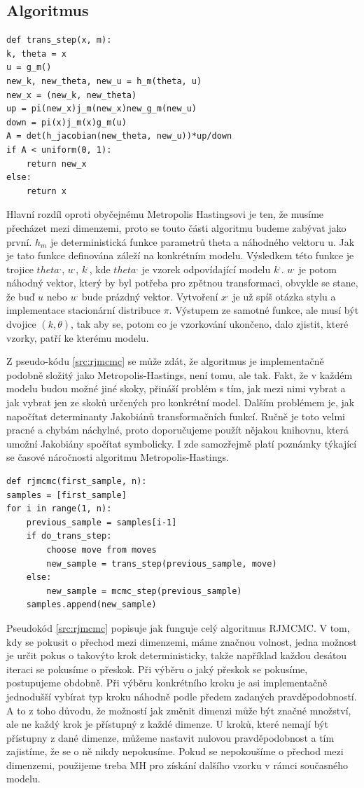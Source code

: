 \documentclass[czech,master,public,dept470,male,cpdeclaration,oneside, python]{diploma}
\begin{document}
\subsection{Algoritmus}
\begin{lstlisting}[label=src:trans_step,caption=Algoritmus pro mezi dimenzionální skok]
def trans_step(x, m):
k, theta = x
u = g_m()
new_k, new_theta, new_u = h_m(theta, u)
new_x = (new_k, new_theta)
up = pi(new_x)j_m(new_x)new_g_m(new_u)
down = pi(x)j_m(x)g_m(u)
A = det(h_jacobian(new_theta, new_u))*up/down
if A < uniform(0, 1):
    return new_x
else:
	return x
\end{lstlisting}
Hlavní rozdíl oproti obyčejnému Metropolis Hastingsovi je ten, že musíme přecházet mezi dimenzemi, proto se touto části algoritmu budeme zabývat jako první. $h_m$ je  deterministická funkce parametrů theta a náhodného vektoru u. Jak je tato funkce definována záleží na konkrétním modelu. Výsledkem této funkce je trojice $theta^{,}$, $u^{,}$, $k^{,}$, kde $theta^{,}$ je vzorek odpovídající modelu $k^{,}$. $u^{,}$ je potom náhodný vektor, který by byl potřeba pro zpětnou transformaci, obvykle se stane, že buď $u$ nebo $u^{,}$ bude prázdný vektor. Vytvoření $x^{,}$ je už spíš otázka stylu a implementace stacionární distribuce $\pi$. Výstupem ze samotné funkce, ale musí být dvojice $(k, \theta)$, tak aby se, potom co je vzorkování ukončeno, dalo zjistit, které vzorky, patří ke kterému modelu. \par
Z pseudo-kódu \ref{src:rjmcmc} se může zdát, že algoritmus je implementačně podobně složitý jako Metropolis-Hastings, není tomu, ale tak. Fakt, že v každém modelu budou možné jiné skoky, přináší problém s tím, jak mezi nimi vybrat a jak vybrat jen ze skoků určených pro konkrétní model. Dalším problémem je, jak napočítat determinanty Jakobiánů transformačních funkcí. Ručně je toto velmi pracné a chybám náchylné, proto doporučujeme použít nějakou knihovnu, která umožní Jakobiány spočítat symbolicky. I zde samozřejmě platí poznámky týkající se časové náročnosti algoritmu Metropolis-Hastings.
\begin{lstlisting}[label=src:rjmcmc,caption=Celkový RJMCMC algoritmus]
def rjmcmc(first_sample, n):
samples = [first_sample]
for i in range(1, n):
	previous_sample = samples[i-1]
	if do_trans_step:
		choose move from moves
		new_sample = trans_step(previous_sample, move)
	else:
		new_sample = mcmc_step(previous_sample)
	samples.append(new_sample)
\end{lstlisting}
Pseudokód \ref{src:rjmcmc} popisuje jak funguje celý algoritmus RJMCMC. V tom, kdy se pokusit o přechod mezi dimenzemi, máme značnou volnost, jedna možnost je určit pokus o takovýto krok deterministicky, takže například každou desátou iteraci se pokusíme o přeskok. Při výběru o jaký přeskok se pokusíme, postupujeme obdobně. Při výběru konkrétního kroku je asi implementačně jednodušší vybírat typ kroku náhodně podle předem zadaných pravděpodobností. A to z toho důvodu, že možností jak změnit dimenzi může být značné množství, ale ne každý krok je přístupný z každé dimenze. U kroků, které nemají být přístupny z dané dimenze, můžeme nastavit nulovou pravděpodobnost a tím zajistíme, že se o ně nikdy nepokusíme. Pokud se nepokoušíme o přechod mezi dimenzemi, použijeme treba MH pro získání dalšího vzorku v rámci současného modelu.
\end{document}
